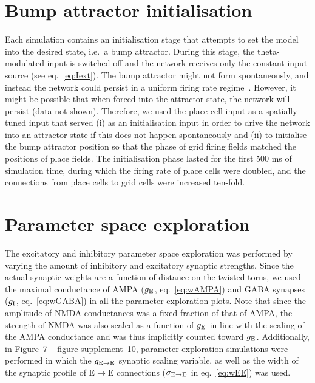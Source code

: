 \documentclass[a4paper,12pt]{article}
\newcommand{\ssc}[3]{\ensuremath{#1_{\text{#2}_{\text{#3}}}}}
\newcommand{\gE      }{\ssc{g}      {\scriptsize{E}}{}}
\newcommand{\gI      }{\ssc{g}      {\scriptsize{I}}{}}
\newcommand{\gEE     }{\ssc{g}      {\scriptsize{E}\ensuremath{\rightarrow}\scriptsize{E}}{}}
\newcommand{\sigmaEE }{\ssc{\sigma} {\scriptsize{E}\ensuremath{\rightarrow}\scriptsize{E}}{}}
\begin{document}
\section{Bump attractor initialisation} \label{sec:noise_bump_init_app}

Each simulation contains an initialisation stage that attempts to set the model
into the desired state, i.e.\ a bump attractor. During this stage, the
theta-modulated input is switched off and the network receives only the
constant input source (see eq.~\ref{eq:Iext}). The bump attractor might not
form spontaneously, and instead the network could persist in a  uniform firing
rate regime~\citep{Compte:2000ul}. However, it might be possible that when
forced into the attractor state, the network will persist (data not shown).
Therefore, we used the place cell input as a spatially-tuned input that served
(i) as an initialisation input in order to drive the network into an attractor
state if this does not happen spontaneously and (ii) to initialise the bump
attractor position so that the phase of grid firing fields matched the positions
of place fields. The initialisation phase lasted for the first 500 ms of
simulation time, during which the firing rate of place cells were doubled, and
the connections from place cells to grid cells were increased ten-fold.



\section{Parameter space exploration} \label{sec:param_sweeps}

The excitatory and inhibitory parameter space exploration was performed by
varying the amount of inhibitory and excitatory synaptic strengths. Since the
actual synaptic weights are a function of distance on the twisted torus, we
used the maximal conductance of AMPA ($\gE$, eq.~\ref{eq:wAMPA}) and GABA
synapses ($\gI$, eq.~\ref{eq:wGABA}) in all the parameter exploration plots.
Note that since the amplitude of NMDA conductances was a fixed fraction of that
of AMPA, the strength of NMDA was also scaled as a function of $\gE$ in line
with the scaling of the AMPA conductance and was thus implicitly counted toward
$\gE$. Additionally, in Figure~7 -- figure supplement~10, parameter exploration
simulations were performed in which the $\gEE$ synaptic scaling variable, as
well as the width of the synaptic profile of E$\rightarrow$E connections
($\sigmaEE$ in eq.~\ref{eq:wEE}) was used.
\end{document}

